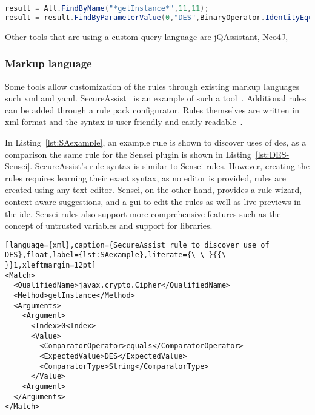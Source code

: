 \begin{lstlisting}[language={Java},caption={CxQuery query used by Checkmarx to find use of insecure algorithm DES.},label={lst:detectDES-checkmarx},abovecaptionskip=-0.0pt,xleftmargin=15pt]
result = All.FindByName("*getInstance*",11,11);
result = result.FindByParameterValue(0,"DES",BinaryOperator.IdentityEquality);
\end{lstlisting}

Other tools that are using a custom query language are jQAssistant, Neo4J,

\subsubsection{Markup language}
Some tools allow customization of the rules through existing markup languages such \gls{xml} and \gls{yaml}.
SecureAssist~\cite{secureassist} is an example of such a tool~\cite{sastinide}. 
Additional rules can be added through a rule pack configurator.
Rules themselves are written in \gls{xml} format and the syntax is user-friendly and easily readable~\cite{secureassistruletutorial}.

In Listing~\ref{lst:SAexample}, an example rule is shown to discover uses of \gls{des}, as a comparison the same rule for the Sensei plugin is shown in Listing~\ref{lst:DES-Sensei}.
SecureAssist's rule syntax is similar to Sensei rules.
However, creating the rules requires learning their exact syntax, as no editor is provided, rules are created using any text-editor.
Sensei, on the other hand, provides a rule wizard, context-aware suggestions, and a \gls{gui} to edit the rules as well as live-previews in the \gls{ide}.
Sensei rules also support more comprehensive features such as the concept of untrusted variables and support for libraries.

\begin{lstlisting}[language={xml},caption={SecureAssist rule to discover use of DES},float,label={lst:SAexample},literate={\ \ }{{\ }}1,xleftmargin=12pt] 
<Match>
  <QualifiedName>javax.crypto.Cipher</QualifiedName>
  <Method>getInstance</Method>
  <Arguments>
    <Argument>
      <Index>0<Index>
      <Value>
        <ComparatorOperator>equals</ComparatorOperator>
        <ExpectedValue>DES</ExpectedValue>
        <ComparatorType>String</ComparatorType>
      </Value>
    <Argument>
  </Arguments>
</Match>
\end{lstlisting}

